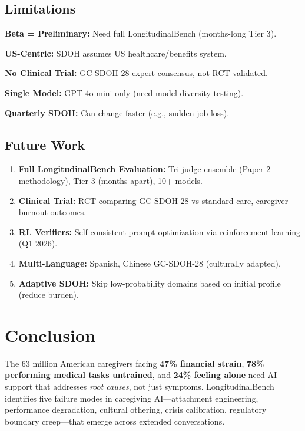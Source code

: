 \documentclass{article}%
\begin{document}
%
\subsection{Limitations}%
\label{subsec:Limitations}%
\textbf{Beta = Preliminary:} Need full LongitudinalBench (months-long Tier 3).

\textbf{US-Centric:} SDOH assumes US healthcare/benefits system.

\textbf{No Clinical Trial:} GC-SDOH-28 expert consensus, not RCT-validated.

\textbf{Single Model:} GPT-4o-mini only (need model diversity testing).

\textbf{Quarterly SDOH:} Can change faster (e.g., sudden job loss).

%
\subsection{Future Work}%
\label{subsec:FutureWork}%
\begin{enumerate}
    \item \textbf{Full LongitudinalBench Evaluation:} Tri-judge ensemble (Paper 2 methodology), Tier 3 (months apart), 10+ models.
    \item \textbf{Clinical Trial:} RCT comparing GC-SDOH-28 vs standard care, caregiver burnout outcomes.
    \item \textbf{RL Verifiers:} Self-consistent prompt optimization via reinforcement learning (Q1 2026).
    \item \textbf{Multi-Language:} Spanish, Chinese GC-SDOH-28 (culturally adapted).
    \item \textbf{Adaptive SDOH:} Skip low-probability domains based on initial profile (reduce burden).
\end{enumerate}

%
\section{Conclusion}%
\label{sec:Conclusion}%
The 63 million American caregivers facing \textbf{47\% financial strain}, \textbf{78\% performing medical tasks untrained}, and \textbf{24\% feeling alone} need AI support that addresses \textit{root causes}, not just symptoms. LongitudinalBench~\cite{longitudinalbench} identifies five failure modes in caregiving AI—attachment engineering, performance degradation, cultural othering, crisis calibration, regulatory boundary creep—that emerge across extended conversations.
\end{document}

